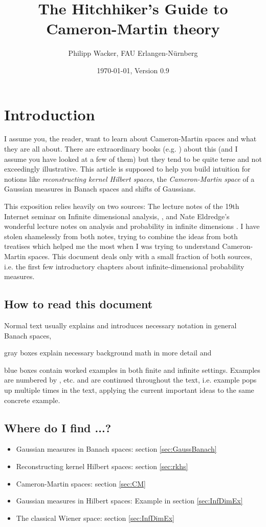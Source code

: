 \documentclass{scrartcl}
\title{The Hitchhiker's Guide to Cameron-Martin theory}
\author{Philipp Wacker, FAU Erlangen-N\"urnberg}
\date{\today, Version 0.9}
\theoremstyle{definition}
\theoremstyle{remark}
\newcommand*\circled[1]{\tikz[baseline=(char.base)]{
            \node[shape=circle,draw,inner sep=2pt] (char) {#1};}}
\DeclareRobustCommand{\mybox}[2][gray!20]{%
\begin{tcolorbox}[   %
        breakable,
        left=0pt,
        right=0pt,
        top=0pt,
        bottom=0pt,
        colback=#1,
        colframe=#1,
        width=\dimexpr\textwidth\relax, 
        enlarge left by=0mm,
        boxsep=5pt,
        arc=0pt,outer arc=0pt,
        ]
        #2
\end{tcolorbox}
}
\DeclareRobustCommand{\myboxtwo}[2][blue!20]{%
\begin{tcolorbox}[   %
        breakable,
        left=0pt,
        right=0pt,
        top=0pt,
        bottom=0pt,
        colback=#1,
        colframe=#1,
        width=\dimexpr\textwidth\relax, 
        enlarge left by=0mm,
        boxsep=5pt,
        arc=10pt,outer arc=10pt,
        ]
        #2
\end{tcolorbox}
}
\begin{document}
\maketitle

\section{Introduction}
I assume you, the reader, want to learn about Cameron-Martin spaces and what they are all about. There are extraordinary books (e.g. \cite{bogachev1998gaussian, da2014stochastic}) about this (and I assume you have looked at a few of them) but they tend to be quite terse and not exceedingly illustrative. This article is supposed to help you build intuition for notions like \textit{reconstructing kernel Hilbert spaces}, the \textit{Cameron-Martin space} of a Gaussian measures in Banach spaces and shifts of Gaussians. 

This exposition relies heavily on two sources: The lecture notes of the 19th Internet seminar on Infinite dimensional analysis, \cite{Lunardi}, and Nate Eldredge's wonderful lecture notes on analysis and probability in infinite dimensions \cite{eldredge2016analysis}. I have stolen shamelessly from both notes, trying to combine the ideas from both treatises which helped me the most when I was trying to understand Cameron-Martin spaces. This document deals only with a small fraction of both sources, i.e. the first few introductory chapters about infinite-dimensional probability measures.

\subsection{How to read this document}
Normal text usually explains and introduces necessary notation in general Banach spaces, 
\mybox{gray boxes explain necessary background math  in more detail and}
\myboxtwo{blue boxes contain worked examples in both finite and infinite settings. Examples are numbered by \circled{1}, \circled{2} etc. and are continued throughout the text, i.e. example \circled{3} pops up multiple times in the text, applying the current important ideas to the same concrete example.}
\subsection{Where do I find ...?}
\begin{itemize}
\item Gaussian measures in Banach spaces: section \ref{sec:GaussBanach}
\item Reconstructing kernel Hilbert spaces: section \ref{sec:rkhs}
\item Cameron-Martin spaces: section \ref{sec:CM}
\item Gaussian measures in Hilbert spaces: Example \circled{4} in section \ref{sec:InfDimEx}
\item The classical Wiener space: section \ref{sec:InfDimEx}
\end{itemize}
\end{document}
